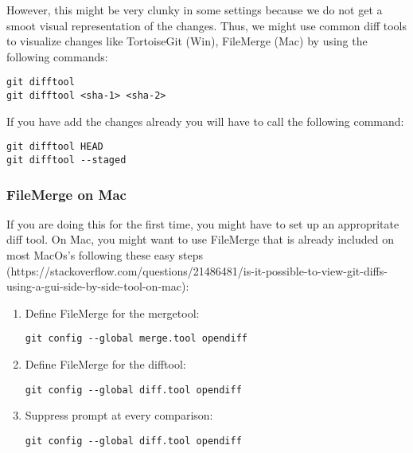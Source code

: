 \documentclass{article}
\begin{document}
However, this might be very clunky in some settings because we do not get a smoot visual representation of the changes. Thus, we might use common diff tools to visualize changes like TortoiseGit (Win), FileMerge (Mac) by using the following commands:
\begin{verbatim}
git difftool
git difftool <sha-1> <sha-2>
\end{verbatim}
If you have add the changes already you will have to call the following command:
\begin{verbatim}
git difftool HEAD
git difftool --staged
\end{verbatim}

\subsubsection{FileMerge on Mac}
If you are doing this for the first time, you might have to set up an appropritate diff tool.
On Mac, you might want to use FileMerge that is already included on most MacOs's following these easy steps (https://stackoverflow.com/questions/21486481/is-it-possible-to-view-git-diffs-using-a-gui-side-by-side-tool-on-mac):
\begin{enumerate}
	\item Define FileMerge for the mergetool:
	\begin{verbatim}
git config --global merge.tool opendiff
	\end{verbatim}
	\item Define FileMerge for the difftool:
	\begin{verbatim}
git config --global diff.tool opendiff	
	\end{verbatim}		
	\item Suppress prompt at every comparison:
	\begin{verbatim}
git config --global diff.tool opendiff
	\end{verbatim}	
\end{enumerate}
\end{document}
